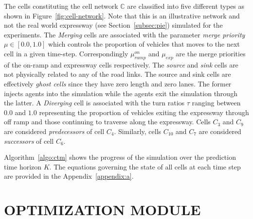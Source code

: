 \documentclass[12pt]{article}
\begin{document}
The cells constituting the cell network $\mathbb{C}$ are classified into five different types as shown in Figure~\ref{fig:cell-network}. Note that this is an illustrative network and not the real world expressway (see Section~\ref{subsec:pie}) simulated for the experiments. The {\it Merging} cells are associated with the parameter {\it merge priority} $\mu\in [0.0,1.0]$ which controls the proportion of vehicles that moves to the next cell in a given time-step. Correspondingly $\mu^{on}_{ramp}$ and $\mu_{exp}$ are the merge priorities of the on-ramp and expressway cells respectively. The {\it source} and {\it sink} cells are not physically related to any of the road links. The source and sink cells are effectively {\it ghost cells} since they have zero length and zero lanes. The former injects agents into the simulation while the agents exit the simulation through the latter. A {\it Diverging} cell is associated with the turn ratios $\tau$ ranging between $0.0$ and $1.0$ representing the proportion of vehicles exiting the expressway through off ramp and those continuing to traverse along the expressway. Cells $C_3$ and $C_9$ are considered {\it predecessors} of cell $C_4$. Similarly, cells $C_{10}$ and $C_7$ are considered {\it successors} of cell $C_6$.

Algorithm~\ref{algo:ctm} shows the progress of the simulation over the prediction time horizon $K$. The equations governing the state of all cells at each time step are provided in the Appendix~\ref{appendix:a}.



\section{OPTIMIZATION MODULE}
\label{sec:optimization}
\end{document}
